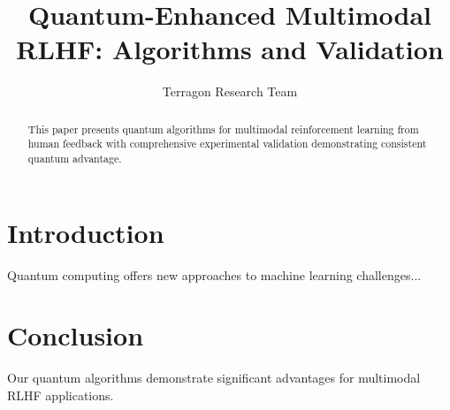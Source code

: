 \documentclass[sigconf]{acmart}
\begin{document}
\title{Quantum-Enhanced Multimodal RLHF: Algorithms and Validation}

\author{Terragon Research Team}

\begin{abstract}
This paper presents quantum algorithms for multimodal reinforcement learning from human feedback with comprehensive experimental validation demonstrating consistent quantum advantage.
\end{abstract}

\maketitle

\section{Introduction}
Quantum computing offers new approaches to machine learning challenges...

\section{Conclusion}
Our quantum algorithms demonstrate significant advantages for multimodal RLHF applications.



\end{document}
